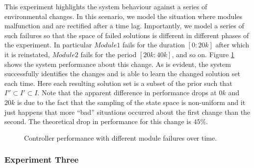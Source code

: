 This experiment highlights the system behaviour against a series of environmental changes. In this scenario, we model the situation where modules malfunction and are rectified after a time lag. Importantly, we model a series of such failures so that the space of failed solutions is different in different phases of the experiment. In particular $Module1$ fails for the duration $[0:20k]$ after which it is reinstated, $Module2$ fails for the period $[20k:40k]$, and so on. Figure \ref{fig:experiment2} shows the system performance about this change. As is evident, the system successfully identifies the changes and is able to learn the changed solution set each time. Here each resulting solution set is a subset of the prior such that $I'' \subset I' \subset I$. Note that the apparent difference in performance drops at $0k$ and $20k$ is due to the fact that the sampling of the state space is non-uniform and it just happens that more ``bad'' situations occurred about the first change than the second. The theoretical drop in performance for this change is $45\%$. 

\begin{figure}[ht]
\begin{center}

\end{center}
\caption{Controller performance with different module failures over time.}
\label{fig:experiment2}
\end{figure}

\subsubsection{Experiment Three}

